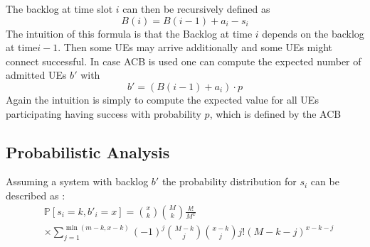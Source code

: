 \documentclass[conference]{IEEEtran}
\begin{document}
The backlog at time slot $i$ can then be recursively defined as
\[B(i) = B(i-1)+a_i-s_i\]
The intuition of this formula is that the Backlog at time $i$ depends on the backlog at time$i-1$.
Then some UEs may arrive additionally and some UEs might connect successful.
In case ACB is used one can compute the expected number of admitted UEs $b'$ with \[b'= (B(i-1)+a_i)\cdot p
\]
Again the intuition is simply to compute the expected value for all UEs participating having success with probability $p$, which is defined by the ACB
\subsection{Probabilistic Analysis}
Assuming a system with backlog $b'$ the probability distribution for $s_i$ can be described as \cite{8422323}:
\begin{align*}
    &\mathds{P}[s_i = k, b'_i = x]= \binom{x}{k}\binom{M}{k}\frac{k!}{M^x}\\
    &\times\sum_{j= 1}^{\min(m-k, x-k)} (-1)^j\binom{M-k}{j}\binom{x-k}{j}j! (M-k-j)^{x-k-j}
\end{align*}
\end{document}
